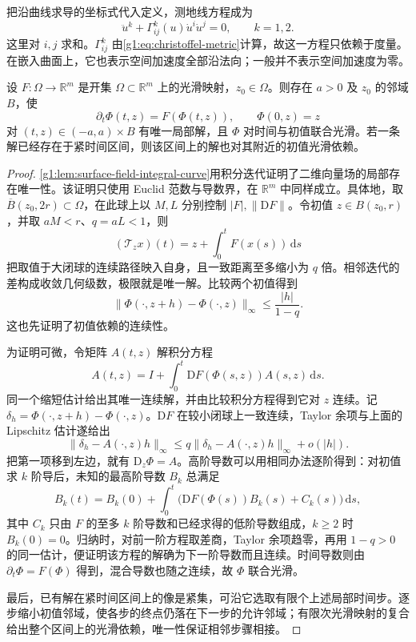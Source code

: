 把沿曲线求导的坐标式代入定义，测地线方程成为
\begin{equation}
	\label{g1:eq:geodesic-equation}
	\ddot u^k+\Gamma^k_{ij}(u)\dot u^i\dot u^j=0,\qquad k=1,2.
\end{equation}
这里对 \(i,j\) 求和。\(\Gamma^k_{ij}\) 由\eqref{g1:eq:christoffel-metric}计算，故这一方程只依赖于度量。在嵌入曲面上，它也表示空间加速度全部沿法向；一般并不表示空间加速度为零。

\begin{lemma}
	\label{g1:lem:smooth-ode-flow}
	设 \(F:\Omega\to\mathbb R^m\) 是开集 \(\Omega\subset\mathbb R^m\) 上的光滑映射，\(z_0\in\Omega\)。则存在 \(a>0\) 及 \(z_0\) 的邻域 \(B\)，使
	\[
		\partial_t\Phi(t,z)=F(\Phi(t,z)),\qquad \Phi(0,z)=z
	\]
	对 \((t,z)\in(-a,a)\times B\) 有唯一局部解，且 \(\Phi\) 对时间与初值联合光滑。若一条解已经存在于紧时间区间，则该区间上的解也对其附近的初值光滑依赖。
\end{lemma}
\begin{proof}
	\cref{g1:lem:surface-field-integral-curve}用积分迭代证明了二维向量场的局部存在唯一性。该证明只使用 Euclid 范数与导数界，在 \(\mathbb R^m\) 中同样成立。具体地，取 \(\overline B(z_0,2r)\subset\Omega\)，在此球上以 \(M,L\) 分别控制 \(|F|,\|\mathrm{D}F\|\)。令初值 \(z\in B(z_0,r)\)，并取 \(aM<r\)、\(q=aL<1\)，则
	\[
		(\mathcal T_zx)(t)=z+\int_0^tF(x(s))\,\mathrm{d}s
	\]
	把取值于大闭球的连续路径映入自身，且一致距离至多缩小为 \(q\) 倍。相邻迭代的差构成收敛几何级数，极限就是唯一解。比较两个初值得到
	\[
		\|\Phi(\cdot,z+h)-\Phi(\cdot,z)\|_\infty\le\frac{|h|}{1-q}.
	\]
	这也先证明了初值依赖的连续性。

	为证明可微，令矩阵 \(A(t,z)\) 解积分方程
	\[
		A(t,z)=I+\int_0^t \mathrm{D}F(\Phi(s,z))A(s,z)\,\mathrm{d}s.
	\]
	同一个缩短估计给出其唯一连续解，并由比较积分方程得到它对 \(z\) 连续。记 \(\delta_h=\Phi(\cdot,z+h)-\Phi(\cdot,z)\)。\(\mathrm{D}F\) 在较小闭球上一致连续，Taylor 余项与上面的 Lipschitz 估计遂给出
	\[
		\|\delta_h-A(\cdot,z)h\|_\infty
		\le q\|\delta_h-A(\cdot,z)h\|_\infty+o(|h|).
	\]
	把第一项移到左边，就有 \(\mathrm{D}_z\Phi=A\)。高阶导数可以用相同办法逐阶得到：对初值求 \(k\) 阶导后，未知的最高阶导数 \(B_k\) 总满足
	\[
		B_k(t)=B_k(0)+\int_0^t\bigl(\mathrm{D}F(\Phi(s))B_k(s)+C_k(s)\bigr)\,\mathrm{d}s,
	\]
	其中 \(C_k\) 只由 \(F\) 的至多 \(k\) 阶导数和已经求得的低阶导数组成，\(k\ge2\) 时 \(B_k(0)=0\)。归纳时，对前一阶方程取差商，Taylor 余项趋零，再用 \(1-q>0\) 的同一估计，便证明该方程的解确为下一阶导数而且连续。时间导数则由 \(\partial_t\Phi=F(\Phi)\) 得到，混合导数也随之连续，故 \(\Phi\) 联合光滑。

	最后，已有解在紧时间区间上的像是紧集，可沿它选取有限个上述局部时间步。逐步缩小初值邻域，使各步的终点仍落在下一步的允许邻域；有限次光滑映射的复合给出整个区间上的光滑依赖，唯一性保证相邻步骤相接。
\end{proof}

